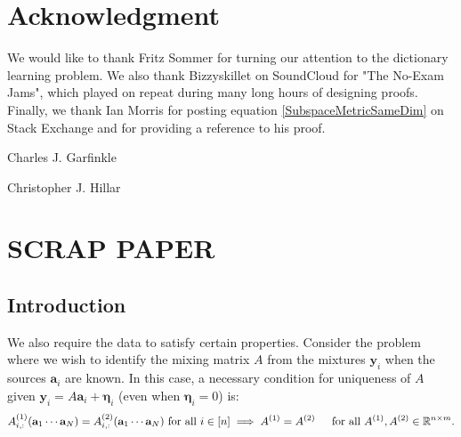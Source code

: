 \documentclass[journal, onecolumn]{IEEEtran}
\begin{document}

\section*{Acknowledgment}
We would like to thank Fritz Sommer for turning our attention to the dictionary learning problem. We also thank Bizzyskillet on SoundCloud for "The No-Exam Jams", which played on repeat during many long hours of designing proofs. Finally, we thank Ian Morris for posting equation \eqref{SubspaceMetricSameDim} on Stack Exchange and for providing a reference to his proof.






\begin{IEEEbiographynophoto}{Charles J. Garfinkle}
\end{IEEEbiographynophoto}

\begin{IEEEbiographynophoto}{Christopher J. Hillar}
\end{IEEEbiographynophoto}


\section*{SCRAP PAPER}

      
\subsection{Introduction}

We also require the data to satisfy certain properties. Consider the problem where we wish to identify the mixing matrix $A$ from the mixtures $\mathbf{y}_i$ when the sources $\mathbf{a}_i$ are known. In this case, a necessary condition for uniqueness of $A$ given $\mathbf{y}_i = A \mathbf{a}_i + \mathbf{\eta}_i$ (even when $\mathbf{\eta}_i=0$) is:
\begin{align}\label{SparkCondition2}
A^{(1)}_{i,:}(\mathbf{a}_1 \cdots \mathbf{a}_N) = A^{(2)}_{i,:}(\mathbf{a}_1 \cdots \mathbf{a}_N)  \text{ for all } i \in [n] \implies A^{(1)}  = A^{(2)} \indent \text{for all } A^{(1)}, A^{(2)} \in \mathbb{R}^{n \times m}.
\end{align}
\end{document}
